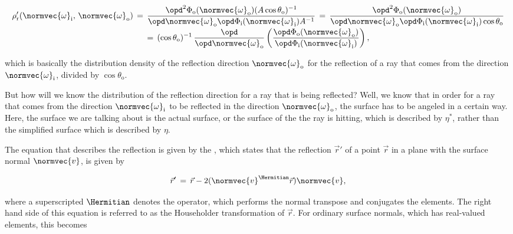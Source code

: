 {\begin{equation} \label{eq:brdf_rewritten}
\renewcommand*{\arraystretch}{2}
\begin{array}{c}
\displaystyle \rho'_{\text{r}}(\normvec{\omega}_{\text{i}},\, \normvec{\omega}_{\text{o}}) \,=\, \frac{\opd^2 \Phi_{\text{o}}(\normvec{\omega}_{\text{o}})(A\cos\theta_{\text{o}})^{-1}}{\opd \normvec{\omega}_{\text{o}}\opd \Phi_{\text{i}}(\normvec{\omega}_{\text{i}})A^{-1}} \,=\, \frac{\opd^2 \Phi_{\text{o}}(\normvec{\omega}_{\text{o}})}{\opd \normvec{\omega}_{\text{o}}\opd \Phi_{\text{i}}(\normvec{\omega}_{\text{i}})\cos\theta_{\text{o}}} \\
\displaystyle =\, (\cos\theta_{\text{o}})^{-1}\, \frac{\opd}{\opd \normvec{\omega}_{\text{o}}}\left(\frac{\opd \Phi_{\text{o}}(\normvec{\omega}_{\text{o}})}{\opd \Phi_{\text{i}}(\normvec{\omega}_{\text{i}})}\right),
\end{array}
\end{equation}

which is basically the distribution density of the reflection direction $\normvec{\omega}_{\text{o}}$ for the reflection of a ray that comes from the direction $\normvec{\omega}_{\text{i}}$, divided by $\cos\theta_{\text{o}}$.

But how will we know the distribution of the reflection direction for a ray that is being reflected? Well, we know that in order for a ray that comes from the direction $\normvec{\omega}_{\text{i}}$ to be reflected in the direction $\normvec{\omega}_{\text{o}}$, the surface has to be angeled in a certain way. Here, the surface we are talking about is the actual surface, or the surface of the \microfacet the ray is hitting, which is described by $\eta^*$, rather than the simplified surface which is described by $\eta$.

The equation that describes the reflection is given by the , which states that the reflection $\vec{r}'$ of a point $\vec{r}$ in a plane with the surface normal $\normvec{v}$, is given by

\begin{equation}
\vec{r}' \,=\, \vec{r} - 2(\normvec{v}^{\Hermitian}\vec{r})\normvec{v},
\end{equation}

where a superscripted $\Hermitian$ denotes the  operator, which performs the normal transpose and conjugates the elements. The right hand side of this equation is referred to as the Householder transformation of $\vec{r}$. For ordinary surface normals, which has real-valued elements, this becomes

}
